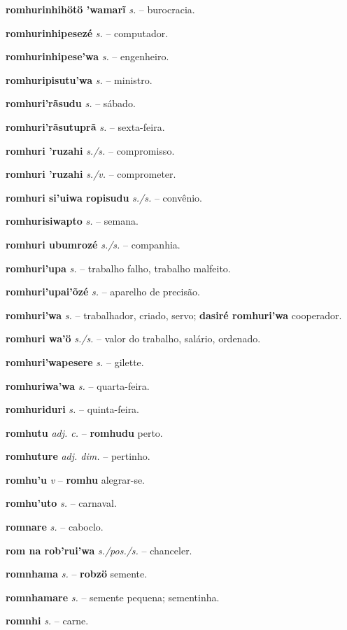 \textbf{romhurinhihötö 'wamarĩ} \textit{s.} -- burocracia.

\textbf{romhurinhipesezé} \textit{s.} -- computador.

\textbf{romhurinhipese'wa} \textit{s.} -- engenheiro.

\textbf{romhuripisutu'wa} \textit{s.} -- ministro.

\textbf{romhuri'rãsudu} \textit{s.} -- sábado.

\textbf{romhuri'rãsutuprã} \textit{s.} -- sexta-feira.

\textbf{romhuri 'ruzahi} \textit{s./s.} -- compromisso.

\textbf{romhuri 'ruzahi} \textit{s./v.} -- comprometer.

\textbf{romhuri si'uiwa ropisudu} \textit{s./s.} -- convênio.

\textbf{romhurisiwapto} \textit{s.} -- semana.

\textbf{romhuri ubumrozé} \textit{s./s.} -- companhia.

\textbf{romhuri'upa} \textit{s.} -- trabalho falho, trabalho malfeito.

\textbf{romhuri'upai'õzé} \textit{s.} -- aparelho de precisão.

\textbf{romhuri'wa} \textit{s.} -- trabalhador, criado, servo; \textbf{dasiré romhuri'wa} cooperador.

\textbf{romhuri wa'ö} \textit{s./s.} -- valor do trabalho, salário, ordenado.

\textbf{romhuri'wapesere} \textit{s.} -- gilette.

\textbf{romhuriwa'wa} \textit{s.} -- quarta-feira.

\textbf{romhuriduri} \textit{s.} -- quinta-feira.

\textbf{romhutu} \textit{adj. c.} -- \textbf{romhudu} perto.

\textbf{romhuture} \textit{adj. dim.} -- pertinho.

\textbf{romhu'u} \textit{v} -- \textbf{romhu} alegrar-se.

\textbf{romhu'uto} \textit{s.} -- carnaval.

\textbf{romnare} \textit{s.} -- caboclo.

\textbf{rom na rob'rui'wa} \textit{s./pos./s.} -- chanceler.

\textbf{romnhama} \textit{s.} -- \textbf{robzö} semente.

\textbf{romnhamare} \textit{s.} -- semente pequena; sementinha.

\textbf{romnhi} \textit{s.} -- carne.

